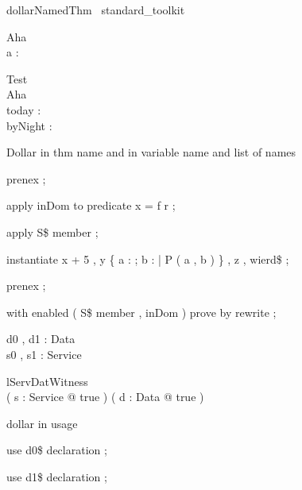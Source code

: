 \begin{zsection}	 \SECTION dollarNamedThm \parents~standard\_toolkit
\end{zsection}



\begin{schema}{Aha}
\\
 a : \nat
\end{schema}



\begin{schema}{Test}
\\
 \Delta Aha \\
 today : \nat \\
 byNight : \nat
\end{schema}



Dollar in thm name and in variable name and list of names
\begin{zproof}

 prenex ;
 
 apply inDom to predicate x = \dom f \cup \dom r ;
 
 apply S\$ member ;
 
 instantiate x  + 5 , y  \{ a : \nat ; b : \nat | P ( a , b ) \} , z  , wierd\$   ;
 
 prenex ;
 
 with enabled ( S\$ member , inDom ) prove by rewrite ;
 

\end{zproof}



\begin{zed}
\end{zed}



\begin{axdef}d0 , d1 : Data \\
 s0 , s1 : Service
\end{axdef}



\begin{theorem}{ lServDatWitness}\\
 ( \exists s : Service @ true ) \land ( \exists d : Data @ true ) \\

\end{theorem}



dollar in usage
\begin{zproof}[lServDatWitness]

 use d0\$ declaration ;
 
 use d1\$ declaration ;
 

\end{zproof}



